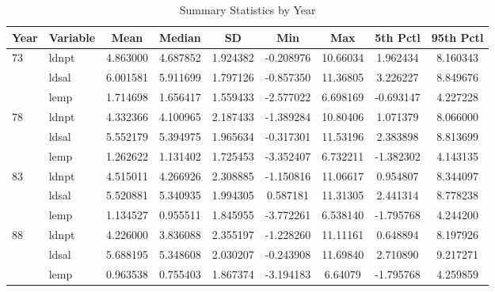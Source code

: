 \begin{table}[htbp!]\centering
\def\sym#1{\ifmmode^{#1}\else\(^{#1}\)\fi}
\caption{Summary Statistics by Year}
\begin{tabular}{llccccccc}
    \toprule
    Year & Variable & Mean & Median & SD & Min & Max & 5th Pctl & 95th Pctl \\
    \midrule
    \multirow{3}{*}{73} 
      & ldnpt & 4.863000 & 4.687852 & 1.924382 & -0.208976 & 10.66034 & 1.962434 & 8.160343 \\
      & ldsal & 6.001581 & 5.911699 & 1.797126 & -0.857350 & 11.36805 & 3.226227 & 8.849676 \\
      & lemp  & 1.714698 & 1.656417 & 1.559433 & -2.577022 & 6.698169 & -0.693147 & 4.227228 \\
    \midrule
    \multirow{3}{*}{78}
      & ldnpt & 4.332366 & 4.100965 & 2.187433 & -1.389284 & 10.80406 & 1.071379 & 8.066000 \\
      & ldsal & 5.552179 & 5.394975 & 1.965634 & -0.317301 & 11.53196 & 2.383898 & 8.813699 \\
      & lemp  & 1.262622 & 1.131402 & 1.725453 & -3.352407 & 6.732211 & -1.382302 & 4.143135 \\
    \midrule
    \multirow{3}{*}{83}
      & ldnpt & 4.515011 & 4.266926 & 2.308885 & -1.150816 & 11.06617 & 0.954807 & 8.344097 \\
      & ldsal & 5.520881 & 5.340935 & 1.994305 & 0.587181  & 11.31305 & 2.441314 & 8.778238 \\
      & lemp  & 1.134527 & 0.955511 & 1.845955 & -3.772261 & 6.538140 & -1.795768 & 4.244200 \\
    \midrule
    \multirow{3}{*}{88}
      & ldnpt & 4.226000 & 3.836088 & 2.355197 & -1.228260 & 11.11161 & 0.648894 & 8.197926 \\
      & ldsal & 5.688195 & 5.348608 & 2.030207 & -0.243908 & 11.69840 & 2.710890 & 9.217271 \\
      & lemp  & 0.963538 & 0.755403 & 1.867374 & -3.194183 & 6.64079 & -1.795768 & 4.259859 \\
    \bottomrule
    \end{tabular}
\end{table}
